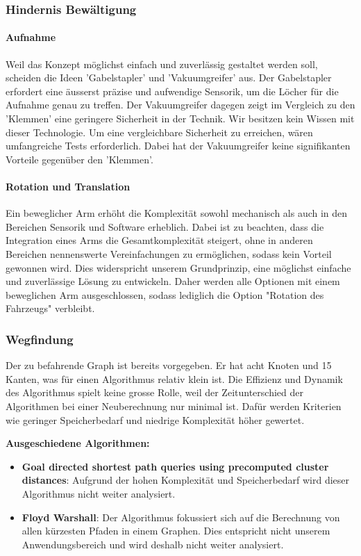 \documentclass[../main.tex]{subfiles}
\begin{document}
    \newpage
    \subsubsection{Hindernis Bewältigung}
        \paragraph{Aufnahme}
        Weil das Konzept möglichst einfach und zuverlässig gestaltet werden soll, scheiden die Ideen 'Gabelstapler' und 'Vakuumgreifer' aus. Der Gabelstapler erfordert eine äusserst präzise und aufwendige Sensorik, um die Löcher für die Aufnahme genau zu treffen. Der Vakuumgreifer dagegen zeigt im Vergleich zu den 'Klemmen' eine geringere Sicherheit in der Technik. Wir besitzen kein Wissen mit dieser Technologie. Um eine vergleichbare Sicherheit zu erreichen, wären umfangreiche Tests erforderlich. Dabei hat der Vakuumgreifer keine signifikanten Vorteile gegenüber den 'Klemmen'.
        
        \paragraph{Rotation und Translation}
        Ein beweglicher Arm erhöht die Komplexität sowohl mechanisch als auch in den Bereichen Sensorik und Software erheblich. Dabei ist zu beachten, dass die Integration eines Arms die Gesamtkomplexität steigert, ohne in anderen Bereichen nennenswerte Vereinfachungen zu ermöglichen, sodass kein Vorteil gewonnen wird. Dies widerspricht unserem Grundprinzip, eine möglichst einfache und zuverlässige Lösung zu entwickeln. Daher werden alle Optionen mit einem beweglichen Arm ausgeschlossen, sodass lediglich die Option "Rotation des Fahrzeugs" verbleibt.


\newpage
\subsubsection{Wegfindung}

Der zu befahrende Graph ist bereits vorgegeben. Er hat acht Knoten und 15 Kanten, was 
für einen Algorithmus relativ klein ist. Die Effizienz und Dynamik des Algorithmus spielt keine grosse Rolle, weil der Zeitunterschied der Algorithmen bei einer Neuberechnung nur minimal ist. Dafür werden Kriterien wie geringer Speicherbedarf und niedrige Komplexität höher gewertet.

\textbf{Ausgeschiedene Algorithmen:}

\begin{itemize}
    \item \textbf{Goal directed shortest path queries using precomputed cluster distances}: Aufgrund der hohen Komplexität und Speicherbedarf wird dieser Algorithmus nicht weiter analysiert.
    \item \textbf{Floyd Warshall}: Der Algorithmus fokussiert sich auf die Berechnung von allen kürzesten Pfaden in einem Graphen. Dies entspricht nicht unserem Anwendungsbereich und wird deshalb nicht weiter analysiert.
\end{itemize}
\end{document}
